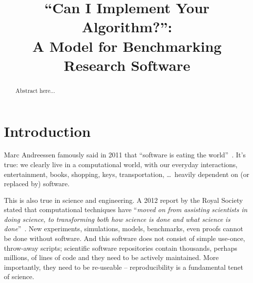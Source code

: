 \documentclass[conference]{IEEEtran}
\begin{document}

\title{``Can I Implement Your Algorithm?'':\\ A Model for Benchmarking Research Software}

\author{
\and
{}
\and
{}
 }

\maketitle

\begin{abstract}
Abstract here...
\end{abstract}

\IEEEpeerreviewmaketitle

\section{Introduction}

Marc Andreessen famously said in 2011 that ``software is eating the
world''~\cite{andreessen:2011}. It's true: we clearly live in a
computational world, with our everyday interactions, entertainment,
books, shopping, keys, transportation, \dots\ heavily dependent on (or
replaced by) software.

This is also true in science and engineering. A 2012 report by the
Royal Society stated that computational techniques have ``{\emph{moved
on from assisting scientists in doing science, to transforming both
how science is done and what science is
done}}''~\cite{rssaaoe:2012}. New experiments, simulations, models,
benchmarks, even proofs cannot be done without software. And this
software does not consist of simple use-once, throw-away scripts;
scientific software repositories contain thousands, perhaps millions,
of lines of code and they need to be actively maintained. More importantly,
they need to be re-useable -- reproducibility is a fundamental tenet of
science.
\end{document}

